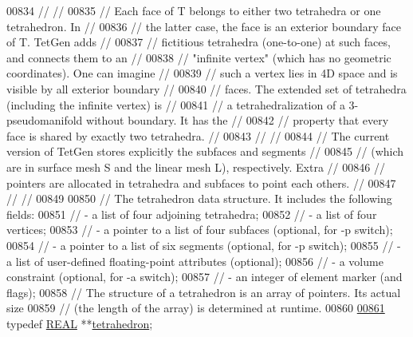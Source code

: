 \begin{DoxyCode}
00834 \textcolor{comment}{//                                                                           //}
00835 \textcolor{comment}{// Each face of T belongs to either two tetrahedra or one tetrahedron. In    //}
00836 \textcolor{comment}{// the latter case, the face is an exterior boundary face of T.  TetGen adds //}
00837 \textcolor{comment}{// fictitious tetrahedra (one-to-one) at such faces, and connects them to an //}
00838 \textcolor{comment}{// "infinite vertex" (which has no geometric coordinates).  One can imagine  //}
00839 \textcolor{comment}{// such a vertex lies in 4D space and is visible by all exterior boundary    //}
00840 \textcolor{comment}{// faces.  The extended set of tetrahedra (including the infinite vertex) is //}
00841 \textcolor{comment}{// a tetrahedralization of a 3-pseudomanifold without boundary.  It has the  //}
00842 \textcolor{comment}{// property that every face is shared by exactly two tetrahedra.             // }
00843 \textcolor{comment}{//                                                                           //}
00844 \textcolor{comment}{// The current version of TetGen stores explicitly the subfaces and segments //}
00845 \textcolor{comment}{// (which are in surface mesh S and the linear mesh L), respectively.  Extra //}
00846 \textcolor{comment}{// pointers are allocated in tetrahedra and subfaces to point each others.   //}
00847 \textcolor{comment}{//                                                                           //}
00849 \textcolor{comment}{}
00850   \textcolor{comment}{// The tetrahedron data structure.  It includes the following fields:}
00851   \textcolor{comment}{//   - a list of four adjoining tetrahedra;}
00852   \textcolor{comment}{//   - a list of four vertices;}
00853   \textcolor{comment}{//   - a pointer to a list of four subfaces (optional, for -p switch);}
00854   \textcolor{comment}{//   - a pointer to a list of six segments  (optional, for -p switch);}
00855   \textcolor{comment}{//   - a list of user-defined floating-point attributes (optional);}
00856   \textcolor{comment}{//   - a volume constraint (optional, for -a switch);}
00857   \textcolor{comment}{//   - an integer of element marker (and flags);}
00858   \textcolor{comment}{// The structure of a tetrahedron is an array of pointers.  Its actual size}
00859   \textcolor{comment}{//   (the length of the array) is determined at runtime.}
00860 
\hypertarget{tetgen_8h_source.tex_l00861}{}\hyperlink{classtetgenmesh_a6a12b1c0d1834ca941d16c62e949e5e3}{00861}   \textcolor{keyword}{typedef} \hyperlink{tetgen_8h_a4b654506f18b8bfd61ad2a29a7e38c25}{REAL} **\hyperlink{classtetgenmesh_a6a12b1c0d1834ca941d16c62e949e5e3}{tetrahedron};

\end{DoxyCode}
